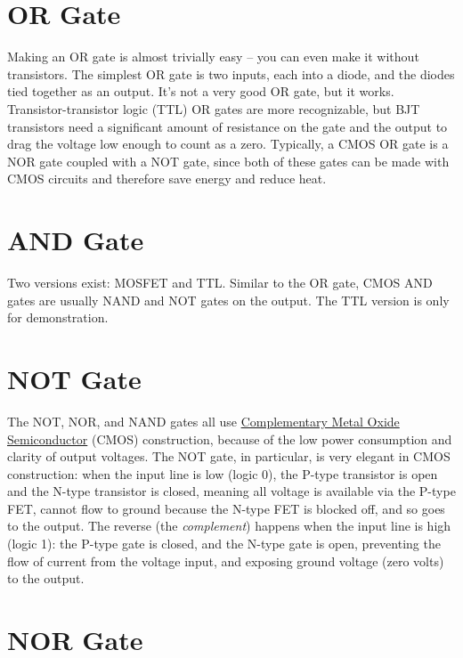 \documentclass[12pt]{article}
\begin{document}
\newpage


\section{OR Gate} Making an OR gate is almost trivially easy -- you can even make it without 
transistors. The simplest OR gate is two inputs, each into a diode, and the diodes tied together 
as an output. It's not a very good OR gate, but it works. 
Transistor-transistor logic (TTL) OR gates are more recognizable, but BJT transistors need a 
significant amount of resistance on the gate and the output to drag the voltage low enough to 
count as a zero. Typically, a CMOS OR gate is a NOR gate coupled with a NOT gate, since both 
of these gates can be made with CMOS circuits and therefore save energy and reduce heat.



\section{AND Gate}

Two versions exist: MOSFET and TTL. Similar to the OR gate, CMOS AND gates are usually NAND and NOT gates on the output.
The TTL version is only for demonstration. 

\section{NOT Gate}

The NOT, NOR, and NAND gates all use {\color{webblue}\href{https://en.wikipedia.org/wiki/CMOS}{Complementary Metal Oxide Semiconductor}} (CMOS) construction, because of the low power consumption and clarity of output voltages. The NOT gate, in particular, is very elegant in CMOS construction: when the input line is low (logic 0), the P-type transistor is open and the N-type transistor is closed, meaning all voltage is available via the P-type FET, cannot flow to ground because the N-type FET is blocked off, and so goes to the output. The reverse (the \emph{complement}) happens when the input line is high (logic 1): the P-type gate is closed, and the N-type gate is open, preventing the flow of current from the voltage input, and exposing ground voltage (zero volts) to the output.

\begin{center}

\end{center}

\section{NOR Gate}
\end{document}
